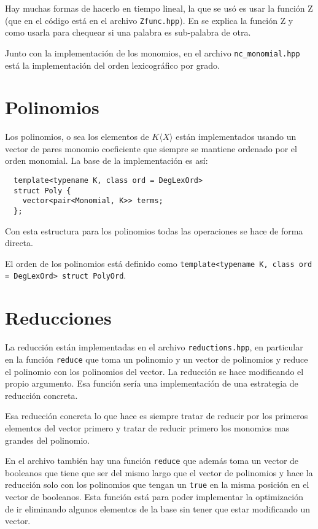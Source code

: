 \documentclass{report}
\theoremstyle{customstyle}
\theoremstyle{factstyle}
\begin{document}
Hay muchas formas de hacerlo en tiempo lineal, la que se usó es usar la función Z (que en el código está en el archivo \texttt{Zfunc.hpp}). En \cite{web:cp-algo:Zfunc} se explica la función Z y como usarla para chequear si una palabra es sub-palabra de otra.

Junto con la implementación de los monomios, en el archivo \texttt{nc\_monomial.hpp} está la implementación del orden lexicográfico por grado.

\section{Polinomios}

Los polinomios, o sea los elementos de $K⟨X⟩$ están implementados usando un vector de pares monomio coeficiente que siempre se mantiene ordenado por el orden monomial. La base de la implementación es así:

\begin{verbatim}
  template<typename K, class ord = DegLexOrd>
  struct Poly {
    vector<pair<Monomial, K>> terms;
  };
\end{verbatim}

Con esta estructura para los polinomios todas las operaciones se hace de forma directa.

El orden de los polinomios está definido como \texttt{template<typename K, class ord = DegLexOrd> struct PolyOrd}.

\section{Reducciones}

La reducción están implementadas en el archivo \texttt{reductions.hpp}, en particular en la función \texttt{reduce} que toma un polinomio y un vector de polinomios y reduce el polinomio con los polinomios del vector. La reducción se hace modificando el propio argumento. Esa función sería una implementación de una estrategia de reducción concreta.

Esa reducción concreta lo que hace es siempre tratar de reducir por los primeros elementos del vector primero y tratar de reducir primero los monomios mas grandes del polinomio.

En el archivo también hay una función \texttt{reduce} que además toma un vector de booleanos que tiene que ser del mismo largo que el vector de polinomios y hace la reducción solo con los polinomios que tengan un \texttt{true} en la misma posición en el vector de booleanos. Esta función está para poder implementar la optimización de ir eliminando algunos elementos de la base sin tener que estar modificando un vector.
\end{document}
